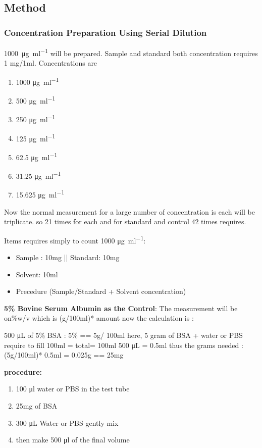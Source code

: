 \documentclass{comjnl}
\begin{document}
\subsection{Method}
\subsubsection{Concentration Preparation Using Serial Dilution}
\qty{1000}{\micro\gram\per\milli\litre} will be prepared. Sample and standard both concentration requires 1 mg/1ml. 
Concentrations are
\begin{enumerate}
    \item 1000 \unit{\micro\gram\per\milli\litre}
    \item 500 \unit{\micro\gram\per\milli\litre}
    \item 250 \unit{\micro\gram\per\milli\litre}
    \item 125 \unit{\micro\gram\per\milli\litre}
    \item 62.5 \unit{\micro\gram\per\milli\litre}
    \item 31.25 \unit{\micro\gram\per\milli\litre}
    \item 15.625 \unit{\micro\gram\per\milli\litre}
\end{enumerate}
Now the normal measurement for a large number of concentration is each will be triplicate. so 21 times for each and for standard and control 42 times requires.

Items requires simply to count 1000 \unit{\micro\gram\per\milli\litre}:
 \begin{itemize}
     \item Sample : 10mg   ||  Standard: 10mg
     \item Solvent: 10ml
     \item Precedure (Sample/Standard + Solvent concentration)
 \end{itemize}

 \textbf{ 5\% Bovine Serum Albumin as the Control}:
 The measurement will be on\%w/v which is (g/100ml)* amount 
 now the calculation is :

 \begin{center}
       500 \unit{\micro\liter} of 5\% BSA :
  5\% == 5g/ 100ml 
  here, 5 gram of BSA + water or PBS require to fill 100ml = total= 100ml
  500 \unit{\micro\liter} = 0.5ml
  thus the grams needed :
  (5g/100ml)* 0.5ml = 0.025g == 25mg
 \end{center}
\textbf{procedure:}
\begin{enumerate}
    \item   100 \unit{\micro\litre} water or PBS in the test tube
    \item    25mg of BSA
     \item  300 \unit{\micro\liter} Water or  PBS gently mix
     \item then make 500 \unit{\micro\litre} of the final volume 

\end{enumerate}   
\end{document}
